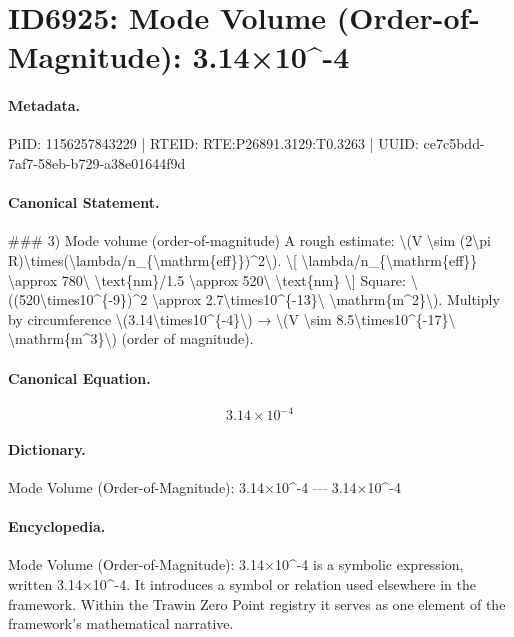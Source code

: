 \section*{ID6925: Mode Volume (Order-of-Magnitude): 3.14×10\textasciicircum{}-4}
\paragraph{Metadata.}
PiID: 1156257843229 | RTEID: RTE:P26891.3129:T0.3263 | UUID: ce7c5bdd-7af7-58eb-b729-a38e01644f9d

\paragraph{Canonical Statement.}
\#\#\# 3) Mode volume (order-of-magnitude) A rough estimate: \textbackslash{}(V \textbackslash{}sim (2\textbackslash{}pi R)\textbackslash{}times(\textbackslash{}lambda/n\_\{\textbackslash{}mathrm\{eff\}\})\textasciicircum{}2\textbackslash{}). \textbackslash{}[ \textbackslash{}lambda/n\_\{\textbackslash{}mathrm\{eff\}\} \textbackslash{}approx 780\textbackslash{} \textbackslash{}text\{nm\}/1.5 \textbackslash{}approx 520\textbackslash{} \textbackslash{}text\{nm\} \textbackslash{}] Square: \textbackslash{}((520\textbackslash{}times10\textasciicircum{}\{-9\})\textasciicircum{}2 \textbackslash{}approx 2.7\textbackslash{}times10\textasciicircum{}\{-13\}\textbackslash{} \textbackslash{}mathrm\{m\textasciicircum{}2\}\textbackslash{}). Multiply by circumference \textbackslash{}(3.14\textbackslash{}times10\textasciicircum{}\{-4\}\textbackslash{}) → \textbackslash{}(V \textbackslash{}sim 8.5\textbackslash{}times10\textasciicircum{}\{-17\}\textbackslash{} \textbackslash{}mathrm\{m\textasciicircum{}3\}\textbackslash{}) (order of magnitude).

\paragraph{Canonical Equation.}
\[
3.14\times10^{-4}
\]

\paragraph{Dictionary.}
Mode Volume (Order-of-Magnitude): 3.14×10\textasciicircum{}-4 — 3.14×10\textasciicircum{}-4

\paragraph{Encyclopedia.}
Mode Volume (Order-of-Magnitude): 3.14×10\textasciicircum{}-4 is a symbolic expression, written 3.14×10\textasciicircum{}-4. It introduces a symbol or relation used elsewhere in the framework. Within the Trawin Zero Point registry it serves as one element of the framework's mathematical narrative.
